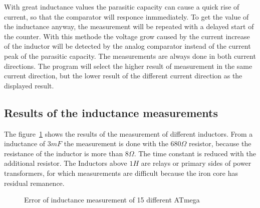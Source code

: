 With great inductance values the parasitic capacity can cause a quick rise of current, so that the comparator
will responce inmmediately.
To get the value of the inductance anyway, the measurement will be repeated with a delayed start of the counter.
With this methode the voltage grow caused by the current increase of the inductor will be detected by the
analog comparator instead of the current peak of the parasitic capacity.
The measurements are always done in both current directions.
The program will select the higher result of measurement in the same current direction, but the
lower result of the different current direction as the displayed result.

\subsection{Results of the inductance measurements}
The figure~\ref{fig:Induct328p} shows the results of the measurement of different inductors.
From a inductance of \(3 mF\) the measurement is done with the \(680 \Omega\) resistor, because
the resistance of the inductor is more than \(8 \Omega\). The time constant is reduced with the
additional resistor.
The Inductors above \(1 H\) are relays or primary sides of power transformers, for which
measurements are difficult because the iron core has residual remanence.


\begin{figure}[H]
\centering

\caption{Error of inductance measurement of 15 different ATmega}
\label{fig:Induct328p}
\end{figure}

